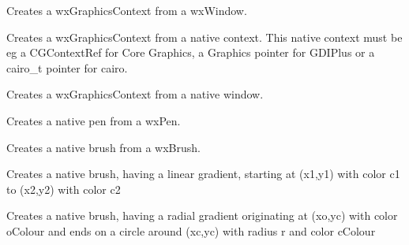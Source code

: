 Creates a wxGraphicsContext from a wxWindow.

\label{wxgraphicsrenderercreatecontextfromnativecontext}


Creates a wxGraphicsContext from a native context. This native context must be eg a CGContextRef for Core Graphics, a Graphics pointer for GDIPlus or a cairo\_t pointer for cairo.

\label{wxgraphicsrenderercreatecontextfromnativewindow}


Creates a wxGraphicsContext from a native window. 

\label{wxgraphicsrenderercreatepen}


Creates a native pen from a wxPen.

\label{wxgraphicsrenderercreatebrush}


Creates a native brush from a wxBrush.

\label{wxgraphicsrenderercreatelineargradientbrush}


Creates a native brush, having a linear gradient, starting at (x1,y1) with color c1 to (x2,y2) with color c2

\label{wxgraphicsrenderercreateradialgradientbrush}


Creates a native brush, having a radial gradient originating at (xo,yc) with color oColour and ends on a circle around (xc,yc) with radius r and color cColour

